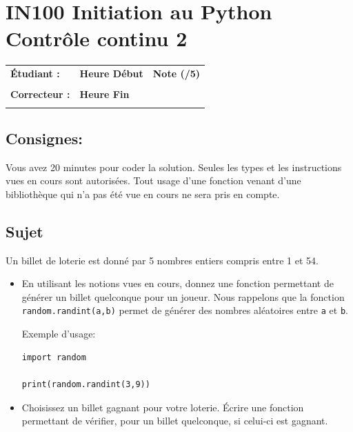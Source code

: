 \documentclass[a4paper,11pt]{article}
\begin{document}
\newtheorem{theo}{Theorem}
\newtheorem{coro}{Corollary}[theo]
\newtheorem{lemme}{Lemma}
\renewcommand{\thecoro}{\thetheo.\arabic{coro}}



\parindent=0cm


\section*{\center IN100 Initiation au Python\\
Contrôle continu 2}

\vspace{1 cm}

\begin{table}[h!]
\centering
\renewcommand{\arraystretch}{1.4} %
\begin{tabular}{|p{10cm}|p{3cm}|p{2cm}|}
\hline
\textbf{Étudiant :} & \textbf{Heure Début }  & \textbf{Note (/5) }  \\
& & \\
\hline
\textbf{Correcteur :} & \textbf{Heure Fin } & \\
& & \\
\hline

\hline
\end{tabular}
\end{table}


\subsection*{Consignes:} Vous avez 20 minutes pour coder la solution. Seules les types et les instructions vues en cours sont autorisées. Tout usage d'une fonction 
venant d'une bibliothèque qui n'a pas été vue en cours ne sera pris en compte. 


\subsection*{Sujet}

Un billet de loterie est donné par 5 nombres entiers compris entre 1 et 54. 


\begin{itemize}
\item[1.]  En utilisant les notions vues en cours, donnez une fonction permettant de générer un billet quelconque pour un joueur. 
Nous rappelons que la fonction \texttt{random.randint(a,b)} permet de générer des nombres aléatoires entre \texttt{a} et \texttt{b}. 

Exemple d'usage: 
\begin{verbatim}
import random

print(random.randint(3,9))

\end{verbatim}

\item[2.] Choisissez un billet gagnant pour votre loterie. \'Ecrire une fonction permettant de vérifier, pour un billet quelconque, si celui-ci est gagnant. 
\end{itemize}
\end{document}
